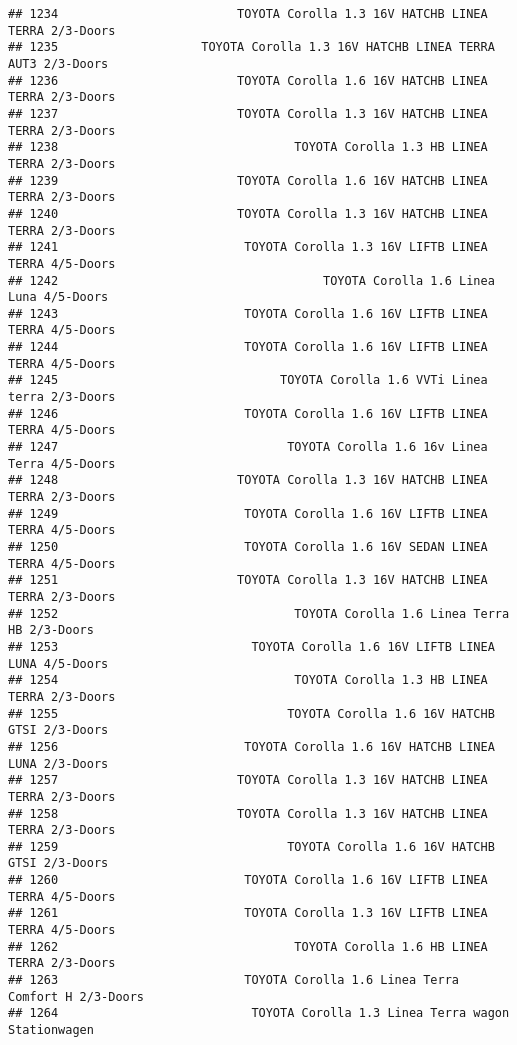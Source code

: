 \documentclass[]{article}
\begin{document}
\begin{verbatim}
## 1234                         TOYOTA Corolla 1.3 16V HATCHB LINEA TERRA 2/3-Doors
## 1235                    TOYOTA Corolla 1.3 16V HATCHB LINEA TERRA AUT3 2/3-Doors
## 1236                         TOYOTA Corolla 1.6 16V HATCHB LINEA TERRA 2/3-Doors
## 1237                         TOYOTA Corolla 1.3 16V HATCHB LINEA TERRA 2/3-Doors
## 1238                                 TOYOTA Corolla 1.3 HB LINEA TERRA 2/3-Doors
## 1239                         TOYOTA Corolla 1.6 16V HATCHB LINEA TERRA 2/3-Doors
## 1240                         TOYOTA Corolla 1.3 16V HATCHB LINEA TERRA 2/3-Doors
## 1241                          TOYOTA Corolla 1.3 16V LIFTB LINEA TERRA 4/5-Doors
## 1242                                     TOYOTA Corolla 1.6 Linea Luna 4/5-Doors
## 1243                          TOYOTA Corolla 1.6 16V LIFTB LINEA TERRA 4/5-Doors
## 1244                          TOYOTA Corolla 1.6 16V LIFTB LINEA TERRA 4/5-Doors
## 1245                               TOYOTA Corolla 1.6 VVTi Linea terra 2/3-Doors
## 1246                          TOYOTA Corolla 1.6 16V LIFTB LINEA TERRA 4/5-Doors
## 1247                                TOYOTA Corolla 1.6 16v Linea Terra 4/5-Doors
## 1248                         TOYOTA Corolla 1.3 16V HATCHB LINEA TERRA 2/3-Doors
## 1249                          TOYOTA Corolla 1.6 16V LIFTB LINEA TERRA 4/5-Doors
## 1250                          TOYOTA Corolla 1.6 16V SEDAN LINEA TERRA 4/5-Doors
## 1251                         TOYOTA Corolla 1.3 16V HATCHB LINEA TERRA 2/3-Doors
## 1252                                 TOYOTA Corolla 1.6 Linea Terra HB 2/3-Doors
## 1253                           TOYOTA Corolla 1.6 16V LIFTB LINEA LUNA 4/5-Doors
## 1254                                 TOYOTA Corolla 1.3 HB LINEA TERRA 2/3-Doors
## 1255                                TOYOTA Corolla 1.6 16V HATCHB GTSI 2/3-Doors
## 1256                          TOYOTA Corolla 1.6 16V HATCHB LINEA LUNA 2/3-Doors
## 1257                         TOYOTA Corolla 1.3 16V HATCHB LINEA TERRA 2/3-Doors
## 1258                         TOYOTA Corolla 1.3 16V HATCHB LINEA TERRA 2/3-Doors
## 1259                                TOYOTA Corolla 1.6 16V HATCHB GTSI 2/3-Doors
## 1260                          TOYOTA Corolla 1.6 16V LIFTB LINEA TERRA 4/5-Doors
## 1261                          TOYOTA Corolla 1.3 16V LIFTB LINEA TERRA 4/5-Doors
## 1262                                 TOYOTA Corolla 1.6 HB LINEA TERRA 2/3-Doors
## 1263                          TOYOTA Corolla 1.6 Linea Terra Comfort H 2/3-Doors
## 1264                           TOYOTA Corolla 1.3 Linea Terra wagon Stationwagen

\end{verbatim}
\end{document}
